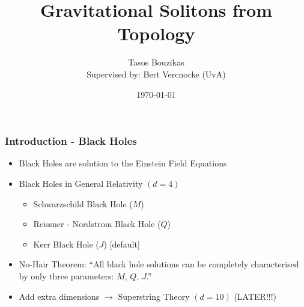 \documentclass[t]{beamer}
\title[Gravitational Solitons from Topology]{Gravitational Solitons from Topology}
\author[Tasos Bouzikas]{Tasos Bouzikas\\{\scriptsize Supervised by: Bert Vercnocke (UvA)}}
\institute[UU] {Utrecht University}
\date{\today}
\begin{document}
\begin{frame}
\titlepage
\end{frame}


\begin{frame}
\frametitle{Introduction - Black Holes}

\begin{itemize}
\setlength{\parskip}{15pt}
\item<1-> Black Holes are solution to the Einstein Field Equations

\item<2-> Black Holes in General Relativity $(d = 4)$

\begin{itemize}
[triangle]
\setlength{\parskip}{5pt}
\item Schwarzschild Black Hole ($M$)
\item Reissner - Nordstrom Black Hole ($Q$)
\item Kerr Black Hole ($J$)
[default]
\end{itemize}


\item<3-> No-Hair Theorem: ``All black hole solutions can be completely characterised by only three parameters: $M$, $Q$, $J$.''

\item<4-> Add extra dimensions $\rightarrow$ Superstring Theory $(d=10)$ \:\:\: (LATER!!!)
\end{itemize}
\end{frame}

\end{document}
